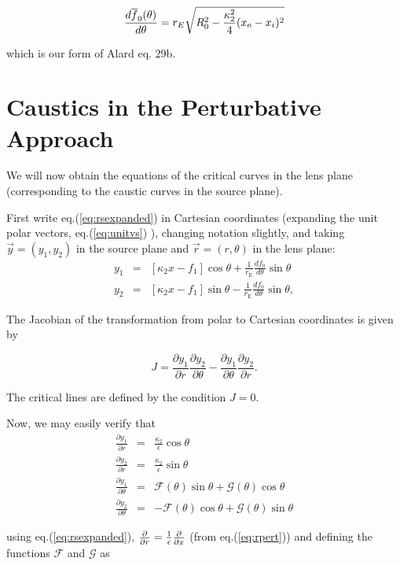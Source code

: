 \documentclass{article}
\def\be{\begin{equation}}
\def\ee{\end{equation}}
\def\eqref{eq.(\ref}
\def\dfdt{{d \overline{f}_0(\theta) \over d \theta}}
\def \te {\theta}
\def \pa {\partial}
\def \re {r_{\mathrm{E}}}
\def \te {\theta}
\def \kt {\kappa_2}
\def \scriptf {\mathcal{F}}
\def \scriptg {\mathcal{G}}
\def \pa {\partial}
\begin{document}
\be
\dfdt = r_E \sqrt{R_0^2 - {\kappa_2^2 \over 4} (x_o-x_i)^2 }
\ee

which is our form of Alard eq. 29b.


\section{Caustics in the Perturbative Approach}


We will now obtain the equations of the critical curves in the lens
plane (corresponding to the caustic curves in the source plane).

First write \eqref{eq:rsexpanded}) in Cartesian coordinates (expanding
the unit polar vectors, \eqref{eq:unitvs}) ), changing notation
slightly, and taking $\vec{y}=(y_1,y_2)$ in the source plane and
$\vec{r}=(r,\te)$ in the lens plane:
\begin{eqnarray}
y_1 &=& [\kt x - f_1]\cos{\te}+\frac{1}{\re}\frac{d f_0}{d\te}\sin{\te} \label{y_1}\\
y_2 &=& [\kt x - f_1]\sin{\te}-\frac{1}{\re}\frac{d f_0}{d\te}\sin{\te} \label{y_2},
\end{eqnarray}

The Jacobian of the transformation from polar to Cartesian coordinates is given by

\begin{equation}
J=\frac{\pa y_1}{\pa r}\frac{\pa y_2}{\pa \te}-\frac{\pa y_1}{\pa \te}\frac{\pa y_2}{\pa r}.
\label{jacob}
\end{equation}

The critical lines are defined by the condition $J=0$. 

Now, we may easily verify that
\begin{eqnarray}
\frac{\pa y_1}{\pa r}&=& \frac{\kt}{\epsilon} \cos{\te}\label{dy1dx}   \\
\frac{\pa y_2}{\pa r}&=& \frac{\kt}{\epsilon} \sin{\te}\\
\frac{\pa y_1}{\pa \te}&=& \scriptf(\te)\sin{\te}+\scriptg(\te)\cos{\te}\\
\frac{\pa y_2}{\pa \te}&=& -\scriptf(\te)\cos{\te}+\scriptg(\te)\sin{\te}\label{dy2dte}
\end{eqnarray}

using \eqref{eq:rsexpanded}), ${\pa \over \pa r} ={ 1 \over \epsilon}
{\pa \over \pa x}$ (from \eqref{eq:rpert})) and defining the functions
$\scriptf$ and $\scriptg$ as
\end{document}
